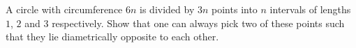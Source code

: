 A circle with circumference $6n$ is divided by $3n$ points into $n$ intervals
of lengths $1$, $2$ and $3$ respectively. Show that one can always pick two of these
points such that they lie diametrically opposite to each other.